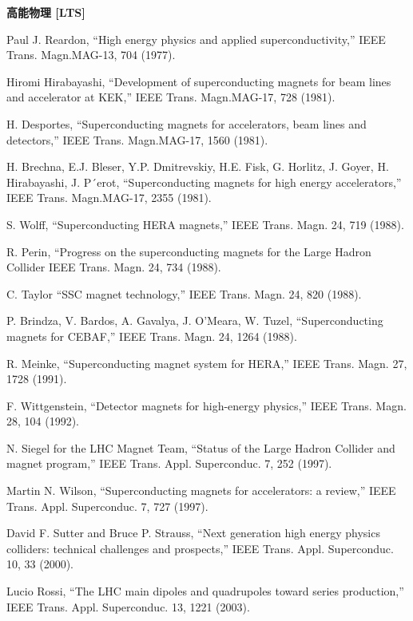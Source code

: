 \noindent \textbf{高能物理 [LTS]}

\noindent [9.268] Paul J. Reardon, ``High energy physics and applied superconductivity,” IEEE
Trans. Magn.MAG-13, 704 (1977).

\noindent [9.269] Hiromi Hirabayashi, ``Development of superconducting magnets for beam lines
and accelerator at KEK,” IEEE Trans. Magn.MAG-17, 728 (1981).

\noindent [9.270] H. Desportes, ``Superconducting magnets for accelerators, beam lines and detectors,”
IEEE Trans. Magn.MAG-17, 1560 (1981).

\noindent [9.271] H. Brechna, E.J. Bleser, Y.P. Dmitrevskiy, H.E. Fisk, G. Horlitz, J. Goyer, H.
Hirabayashi, J. P´erot, ``Superconducting magnets for high energy accelerators,”
IEEE Trans. Magn.MAG-17, 2355 (1981).

\noindent [9.272] S. Wolff, ``Superconducting HERA magnets,” IEEE Trans. Magn. 24, 719 (1988).

\noindent [9.273] R. Perin, ``Progress on the superconducting magnets for the Large Hadron Collider
IEEE Trans. Magn. 24, 734 (1988).

\noindent [9.274] C. Taylor ``SSC magnet technology,” IEEE Trans. Magn. 24, 820 (1988).

\noindent [9.275] P. Brindza, V. Bardos, A. Gavalya, J. O’Meara, W. Tuzel, ``Superconducting
magnets for CEBAF,” IEEE Trans. Magn. 24, 1264 (1988).

\noindent [9.276] R. Meinke, ``Superconducting magnet system for HERA,” IEEE Trans. Magn. 27,
1728 (1991).

\noindent [9.277] F. Wittgenstein, ``Detector magnets for high-energy physics,” IEEE Trans. Magn.
28, 104 (1992).

\noindent [9.278] N. Siegel for the LHC Magnet Team, ``Status of the Large Hadron Collider and
magnet program,” IEEE Trans. Appl. Superconduc. 7, 252 (1997).

\noindent [9.279] Martin N. Wilson, ``Superconducting magnets for accelerators: a review,” IEEE
Trans. Appl. Superconduc. 7, 727 (1997).

\noindent [9.280] David F. Sutter and Bruce P. Strauss, ``Next generation high energy physics
colliders: technical challenges and prospects,” IEEE Trans. Appl. Superconduc.
10, 33 (2000).

\noindent [9.281] Lucio Rossi, ``The LHC main dipoles and quadrupoles toward series production,”
IEEE Trans. Appl. Superconduc. 13, 1221 (2003).

